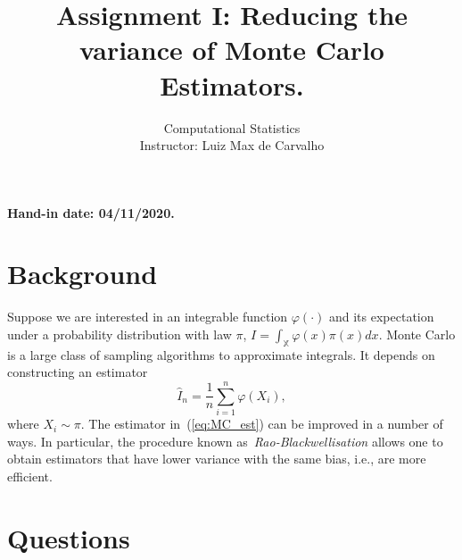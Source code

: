 \documentclass[a4paper,10pt, notitlepage]{report}
\title{Assignment I: Reducing the variance of Monte Carlo Estimators.}
\author{Computational Statistics \\ Instructor: Luiz Max de Carvalho}
\begin{document}
\maketitle

\textbf{Hand-in date: 04/11/2020.}


\section*{Background}

Suppose we are interested in an integrable function $\varphi(\cdot)$ and its expectation under a probability distribution with law $\pi$, $I = \int_{\mathbb{X}} \varphi(x) \pi(x) dx$.
Monte Carlo is a large class of sampling algorithms to approximate integrals.
It depends on constructing an estimator
\begin{equation}
\label{eq:MC_est}
 \hat{I}_n = \frac{1}{n} \sum_{i=1}^n \varphi(X_i),
\end{equation}
where $X_i \sim \pi$.
The estimator in~(\ref{eq:MC_est}) can be improved in a number of ways.
In particular, the procedure known as~\textit{Rao-Blackwellisation} allows one to obtain estimators that have lower variance with the same bias, i.e., are more efficient.

\section*{Questions}
\end{document}
